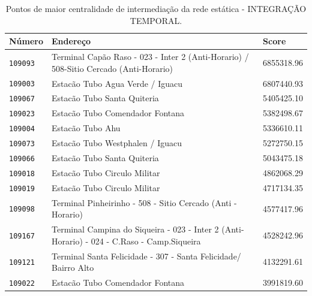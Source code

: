 \begin{table}[htb]
    \caption{Pontos de maior centralidade de intermediação da rede estática - INTEGRAÇÃO TEMPORAL.}
    \label{tab:centralidade-intermediação-rede-estatica-integracao-temporal}
    \centering
    \footnotesize
    \begin{tabular}{p{1.0cm}p{8.0cm}p{3.0cm} } 
        \hline
        Número & Endereço  & Score \\
        \hline
       \texttt{109093} &       Terminal Capão Raso - 023 - Inter 2 (Anti-Horario) / 508-Sitio Cercado (Anti-Horario)  & 6855318.96 \\
       \texttt{109003} &                                                            Estacão Tubo Agua Verde / Iguacu  & 6807440.93 \\
       \texttt{109067} &                                                                 Estacão Tubo Santa Quiteria  & 5405425.10 \\
       \texttt{109023} &                                                             Estacão Tubo Comendador Fontana  & 5382498.67 \\
       \texttt{109004} &                                                                            Estacão Tubo Ahu  & 5336610.11 \\
       \texttt{109073} &                                                            Estacão Tubo Westphalen / Iguacu  & 5272750.15 \\
       \texttt{109066} &                                                                 Estacão Tubo Santa Quiteria  & 5043475.18 \\
       \texttt{109018} &                                                                Estacão Tubo Circulo Militar  & 4862068.29 \\
       \texttt{109019} &                                                                Estacão Tubo Circulo Militar  & 4717134.35 \\
       \texttt{109098} &                                 Terminal Pinheirinho - 508 - Sitio Cercado (Anti - Horario)  & 4577417.96 \\
       \texttt{109167} &  Terminal Campina do Siqueira - 023 - Inter 2 (Anti-Horario) - 024 - C.Raso - Camp.Siqueira  & 4528242.96 \\
       \texttt{109121} &                             Terminal Santa Felicidade - 307 - Santa Felicidade/ Bairro Alto  & 4132291.61 \\
       \texttt{109022} &                                                             Estacão Tubo Comendador Fontana  & 3991819.60 \\

\end{tabular}
\end{table}
